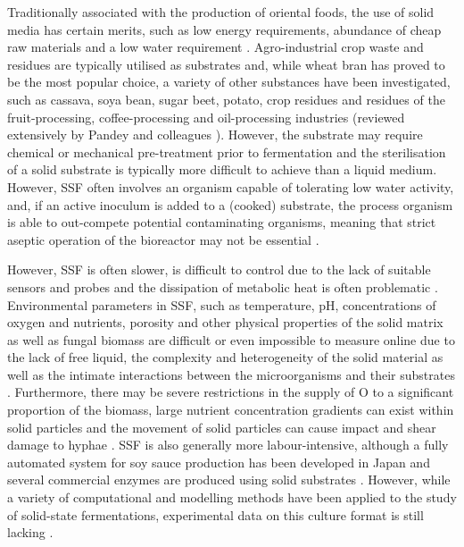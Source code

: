 Traditionally associated with the production of oriental foods, the use of solid media has certain merits, such as low energy requirements, abundance of cheap raw materials and a low water requirement \cite{smith1983}. Agro-industrial crop waste and residues are typically utilised as substrates and, while wheat bran has proved to be the most popular choice, a variety of other substances have been investigated, such as cassava, soya bean, sugar beet, potato, crop residues and residues of the fruit-processing, coffee-processing and oil-processing industries (reviewed extensively by Pandey and colleagues \cite{pandey2000}). However, the substrate may require chemical or mechanical pre-treatment prior to fermentation \cite{pandey1999} and the sterilisation of a solid substrate is typically more difficult to achieve than a liquid medium. However, SSF often involves an organism capable of tolerating low water activity, and, if an active inoculum is added to a (cooked) substrate, the process organism is able to out-compete potential contaminating organisms, meaning that strict aseptic operation of the bioreactor may not be essential \cite{pandey2000}.

However, SSF is often slower, is difficult to control due to the lack of suitable sensors and probes and the dissipation of metabolic heat is often problematic \cite{smith1983}. Environmental parameters in SSF, such as temperature, pH, concentrations of oxygen and nutrients, porosity and other physical properties of the solid matrix as well as fungal biomass are difficult or even impossible to measure online due to the lack of free liquid, the complexity and heterogeneity of the solid material as well as the intimate interactions between the microorganisms and their substrates \cite{lenz2004}. Furthermore, there may be severe restrictions in the supply of O to a significant proportion of the biomass, large nutrient concentration gradients can exist within solid particles and the movement of solid particles can cause impact and shear damage to hyphae \cite{mitchell2006}. SSF is also generally more labour-intensive, although a fully automated system for soy sauce production has been developed in Japan \cite{machida2002} and several commercial enzymes are produced using solid substrates \cite{oda2006}. However, while a variety of computational and modelling methods have been applied to the study of solid-state fermentations, experimental data on this culture format is still lacking \cite{lenz2004}.